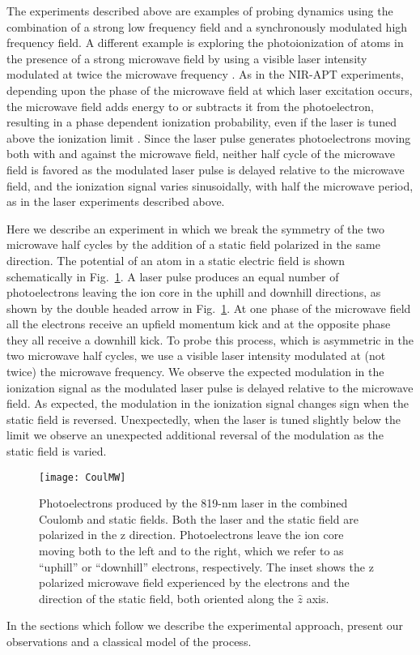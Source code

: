 \documentclass[aps,pra,reprint,groupedaddress]{revtex4-1}
\begin{document}
The experiments described above are examples of probing dynamics using the combination of a strong low frequency field and a synchronously modulated high frequency field. A different example is exploring the photoionization of atoms in the presence of a strong microwave field by using a visible laser intensity modulated at twice the microwave frequency \cite{Carrat}. As in the NIR-APT experiments, depending upon the phase of the microwave field at which laser excitation occurs, the microwave field adds energy to or subtracts it from the photoelectron, resulting in a phase dependent ionization probability, even if the laser is tuned above the ionization limit \cite{Shuman}. Since the laser pulse generates photoelectrons moving both with and against the microwave field, neither half cycle of the microwave field is favored as the modulated laser pulse is delayed relative to the microwave field, and the ionization signal varies sinusoidally, with half the microwave period, as in the laser experiments described above.

Here we describe an experiment in which we break the symmetry of the two microwave half cycles by the addition of a static field polarized in the same direction. The potential of an atom in a static electric field is shown schematically in Fig.~\ref{fig:CoulMW}. A laser pulse produces an equal number of photoelectrons leaving the ion core in the uphill and downhill directions, as shown by the double headed arrow in Fig.~\ref{fig:CoulMW}. At one phase of the microwave field all the electrons receive an upfield momentum kick and at the opposite phase they all receive a downhill kick. To probe this process, which is asymmetric in the two microwave half cycles, we use a visible laser intensity modulated at (not twice) the microwave frequency. We observe the expected modulation in the ionization signal as the modulated laser pulse is delayed relative to the microwave field. As expected, the modulation in the ionization signal changes sign when the static field is reversed. Unexpectedly, when the laser is tuned slightly below the limit we observe an unexpected additional reversal of the modulation as the static field is varied.

\begin{figure}
	\texttt{[image: CoulMW]}
	\caption{Photoelectrons produced by the 819-nm laser in the combined Coulomb and static fields. Both the laser and the static field are polarized in the z direction. Photoelectrons leave the ion core moving both to the left and to the right, which we refer to as ``uphill'' or ``downhill'' electrons, respectively. The inset shows the z polarized microwave field experienced by the electrons and the direction of the static field, both oriented along the $\hat{z}$ axis.}
	\label{fig:CoulMW}
\end{figure}
In the sections which follow we describe the experimental approach, present our observations and a classical model of the process.
\end{document}
